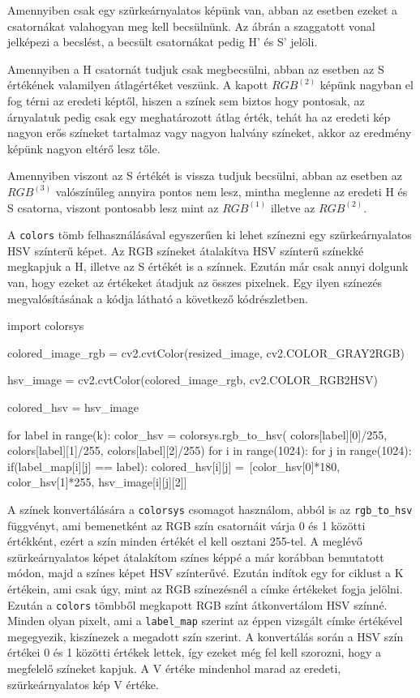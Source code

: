 Amennyiben csak egy szürkeárnyalatos képünk van, abban az esetben ezeket a csatornákat valahogyan meg kell becsülnünk. Az ábrán a szaggatott vonal jelképezi a becslést, a becsült csatornákat pedig H' és S' jelöli.

Amennyiben a H csatornát tudjuk csak megbecsülni, abban az esetben az S értékének valamilyen átlagértéket veszünk. A kapott $RGB^{(2)}$ képünk nagyban el fog térni az eredeti képtől, hiszen a színek sem biztos hogy pontosak, az árnyalatuk pedig csak egy meghatározott átlag érték, tehát ha az eredeti kép nagyon erős színeket tartalmaz vagy nagyon halvány színeket, akkor az eredmény képünk nagyon eltérő lesz tőle.

Amennyiben viszont az S értékét is vissza tudjuk becsülni, abban az esetben az $RGB^{(3)}$ valószínűleg annyira pontos nem lesz, mintha meglenne az eredeti H és S csatorna, viszont pontosabb lesz mint az $RGB^{(1)}$ illetve az $RGB^{(2)}$.

A \texttt{colors} tömb felhasználásával egyszerűen ki lehet színezni egy szürkeárnyalatos HSV színterű képet. Az RGB színeket átalakítva HSV színterű színekké megkapjuk a H, illetve az S értékét is a színnek. Ezután már csak annyi dolgunk van, hogy ezeket az értékeket átadjuk az összes pixelnek. Egy ilyen színezés megvalósításának a kódja látható a következő kódrészletben.
\begin{python}
import colorsys

colored_image_rgb = cv2.cvtColor(resized_image, cv2.COLOR_GRAY2RGB)

hsv_image = cv2.cvtColor(colored_image_rgb, cv2.COLOR_RGB2HSV)

colored_hsv = hsv_image

for label in range(k):
    color_hsv = colorsys.rgb_to_hsv(
        colors[label][0]/255,
        colors[label][1]/255,
        colors[label][2]/255)
    for i in range(1024):
        for j in range(1024):
            if(label_map[i][j] == label):
                colored_hsv[i][j] =\
                [color_hsv[0]*180, color_hsv[1]*255, hsv_image[i][j][2]]
\end{python}

A színek konvertálására a \texttt{colorsys} csomagot használom, abból is az \texttt{rgb\_to\_hsv} függvényt, ami bemenetként az RGB szín csatornáit várja 0 és 1 közötti értékként, ezért a szín minden értékét el kell osztani 255-tel. A meglévő szürkeárnyalatos képet átalakítom színes képpé a már korábban bemutatott módon, majd a színes képet HSV színterűvé. Ezután indítok egy for ciklust a K értékein, ami csak úgy, mint az RGB színezésnél a címke értékeket fogja jelölni. Ezután a \texttt{colors} tömbből megkapott RGB színt átkonvertálom HSV színné. Minden olyan pixelt, ami a \texttt{label\_map} szerint az éppen vizsgált címke értékével megegyezik, kiszínezek a megadott szín szerint. A konvertálás során a HSV szín értékei 0 és 1 közötti értékek lettek, így ezeket még fel kell szorozni, hogy a megfelelő színeket kapjuk. A V értéke mindenhol marad az eredeti, szürkeárnyalatos kép V értéke.

